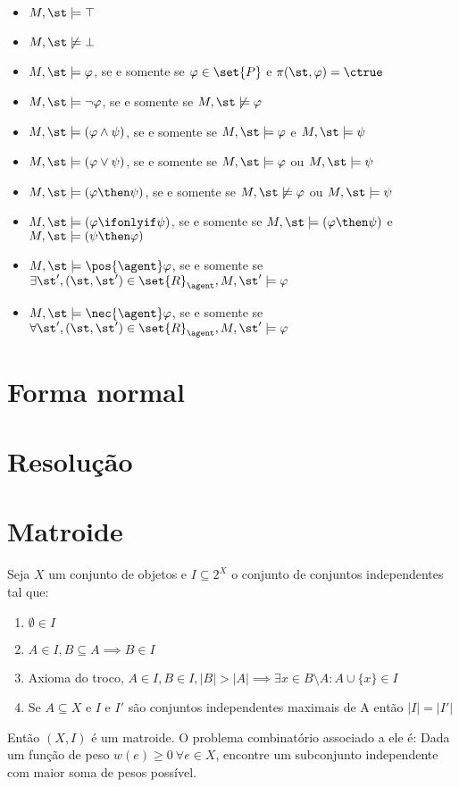 \begin{itemize}
\item $M,\st \models \top$
\item $M,\st \not\models \bot$
\item $M,\st \models \varphi$, se e somente se $\varphi \in \set{P}$ e $\pi(\st, \varphi) = \ctrue$
\item $M,\st \models \neg\varphi$, se e somente se $M,\st \not\models \varphi$
\item $M,\st \models (\varphi \land \psi)$, se e somente se $M,\st \models \varphi$ e $M,\st \models \psi $
\item $M,\st \models (\varphi \lor \psi)$, se e somente se $M,\st \models \varphi$ ou $M,\st \models \psi $
\item $M,\st \models (\varphi \then \psi)$, se e somente se $M,\st \not\models \varphi$ ou $M,\st \models \psi $
\item $M,\st \models (\varphi \ifonlyif \psi)$, se e somente se $M,\st \models (\varphi \then \psi)$ e $M,\st \models (\psi \then \varphi)$

\item $M,\st \models \pos{\agent}\varphi$, se e somente se $\exists\st', (\st, \st') \in \set{R}_\agent, M,\st' \models \varphi$
\item $M,\st \models \nec{\agent}\varphi$, se e somente se $\forall\st', (\st, \st') \in \set{R}_\agent, M,\st' \models \varphi$

\end{itemize}

\section{Forma normal}
\section{Resolução}

\section{Matroide}
Seja $X$ um conjunto de objetos e $I \subseteq 2^X$ o conjunto de conjuntos independentes tal que:
\begin{enumerate}
\item $\emptyset \in I$
\item $A \in I, B \subseteq A \implies B \in I$
\item Axioma do troco, $A \in I, B \in I, |B| > |A| \implies \exists x \in B \setminus A : A \cup \{x\} \in I$
\item Se $A \subseteq X$ e $I$ e $I'$ são conjuntos independentes maximais de A então $|I| = |I'|$
\end{enumerate}
Então $(X, I)$ é um matroide. O problema combinatório associado a ele é: Dada um função de peso $w(e) \geq 0 ~\forall e \in X$, encontre um subconjunto independente com maior soma de pesos possível.
